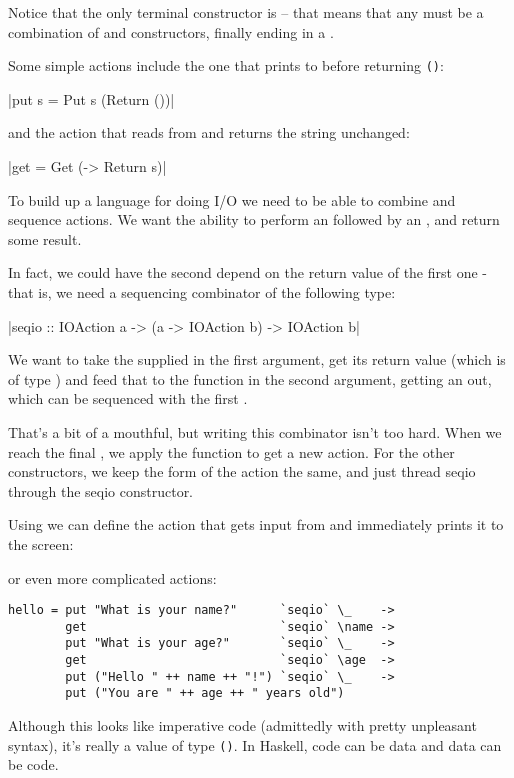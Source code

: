 \documentclass[thesis-solanki.tex]{subfiles}
\begin{document}
Notice that the only terminal constructor is  --
that means that any  must be a combination of  and  constructors, 
finally ending in a .

Some simple actions include the one that prints to  before returning \Verb!()!:

|put s = Put s (Return ())|

and the action that reads from  and returns the string unchanged:

|get = Get (\s -> Return s)|

To build up a language for doing I/O we need to be able to combine and sequence actions. We want the ability to perform an   
followed by an  , and return some result.

In fact, we could have the second  depend on the return value of the first one -
that is, we need a sequencing combinator of the 
following type:

|seqio :: IOAction a -> (a -> IOAction b) -> IOAction b|

We want to take the   supplied in the first argument, get its return value (which is of type ) and feed that to the function in 
the second argument, getting an   out, which can be sequenced with the first  .

That's a bit of a mouthful, but writing this combinator isn't too hard. When we reach the final , we apply the function  to get a 
new action. For the other constructors, we keep the form of the action the same, and just thread seqio through the seqio constructor.

Using  we can define the action that gets input from  and immediately prints it to
the screen: 


or even more complicated actions:
\begin{verbatim}
hello = put "What is your name?"      `seqio` \_    ->
        get                           `seqio` \name ->
        put "What is your age?"       `seqio` \_    ->
        get                           `seqio` \age  ->
        put ("Hello " ++ name ++ "!") `seqio` \_    ->
        put ("You are " ++ age ++ " years old")
\end{verbatim}
Although this looks like imperative code (admittedly with pretty unpleasant syntax), it's really a value of type  \Verb!()!. In Haskell,
code can be data and data can be code.
\end{document}
